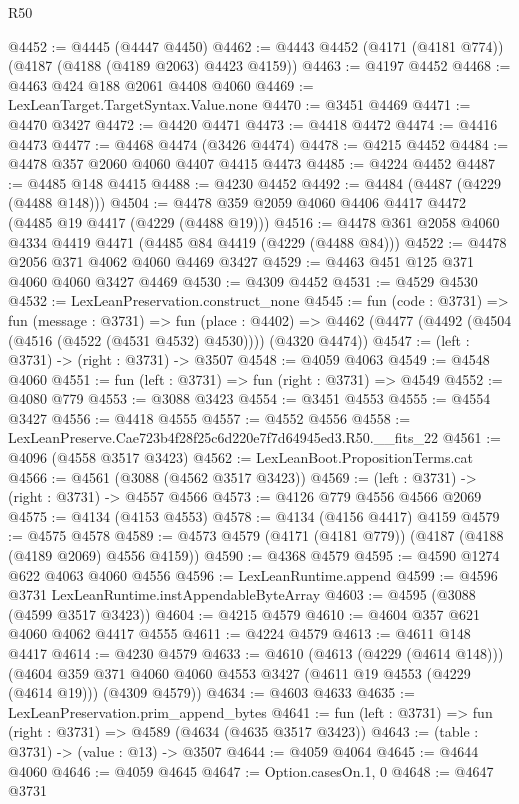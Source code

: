 \begin{lexlean}{R50}
\begin{coremodule}
@4452 := @4445 (@4447 @4450)
@4462 := @4443 @4452 (@4171 (@4181 @774)) (@4187 (@4188 (@4189 @2063) @4423 @4159))
@4463 := @4197 @4452
@4468 := @4463 @424 @188 @2061 @4408 @4060
@4469 := LexLeanTarget.TargetSyntax.Value.none
@4470 := @3451 @4469
@4471 := @4470 @3427
@4472 := @4420 @4471
@4473 := @4418 @4472
@4474 := @4416 @4473
@4477 := @4468 @4474 (@3426 @4474)
@4478 := @4215 @4452
@4484 := @4478 @357 @2060 @4060 @4407 @4415 @4473
@4485 := @4224 @4452
@4487 := @4485 @148 @4415
@4488 := @4230 @4452
@4492 := @4484 (@4487 (@4229 (@4488 @148)))
@4504 := @4478 @359 @2059 @4060 @4406 @4417 @4472 (@4485 @19 @4417 (@4229 (@4488 @19)))
@4516 := @4478 @361 @2058 @4060 @4334 @4419 @4471 (@4485 @84 @4419 (@4229 (@4488 @84)))
@4522 := @4478 @2056 @371 @4062 @4060 @4469 @3427
@4529 := @4463 @451 @125 @371 @4060 @4060 @3427 @4469
@4530 := @4309 @4452
@4531 := @4529 @4530
@4532 := LexLeanPreservation.construct_none
@4545 := fun (code : @3731) =>
  fun (message : @3731) =>
  fun (place : @4402) =>
  @4462 (@4477 (@4492 (@4504 (@4516 (@4522 (@4531 @4532) @4530)))) (@4320 @4474))
@4547 := (left : @3731) -> (right : @3731) -> @3507
@4548 := @4059 @4063
@4549 := @4548 @4060
@4551 := fun (left : @3731) => fun (right : @3731) => @4549
@4552 := @4080 @779
@4553 := @3088 @3423
@4554 := @3451 @4553
@4555 := @4554 @3427
@4556 := @4418 @4555
@4557 := @4552 @4556
@4558 := LexLeanPreserve.Cae723b4f28f25c6d220e7f7d64945ed3.R50.__fits_22
@4561 := @4096 (@4558 @3517 @3423)
@4562 := LexLeanBoot.PropositionTerms.cat
@4566 := @4561 (@3088 (@4562 @3517 @3423))
@4569 := (left : @3731) -> (right : @3731) -> @4557 @4566
@4573 := @4126 @779 @4556 @4566 @2069
@4575 := @4134 (@4153 @4553)
@4578 := @4134 (@4156 @4417) @4159
@4579 := @4575 @4578
@4589 := @4573 @4579 (@4171 (@4181 @779)) (@4187 (@4188 (@4189 @2069) @4556 @4159))
@4590 := @4368 @4579
@4595 := @4590 @1274 @622 @4063 @4060 @4556
@4596 := LexLeanRuntime.append
@4599 := @4596 @3731 LexLeanRuntime.instAppendableByteArray
@4603 := @4595 (@3088 (@4599 @3517 @3423))
@4604 := @4215 @4579
@4610 := @4604 @357 @621 @4060 @4062 @4417 @4555
@4611 := @4224 @4579
@4613 := @4611 @148 @4417
@4614 := @4230 @4579
@4633 := @4610
    (@4613 (@4229 (@4614 @148)))
    (@4604 @359 @371 @4060 @4060 @4553 @3427 (@4611 @19 @4553 (@4229 (@4614 @19))) (@4309 @4579))
@4634 := @4603 @4633
@4635 := LexLeanPreservation.prim_append_bytes
@4641 := fun (left : @3731) => fun (right : @3731) => @4589 (@4634 (@4635 @3517 @3423))
@4643 := (table : @3731) -> (value : @13) -> @3507
@4644 := @4059 @4064
@4645 := @4644 @4060
@4646 := @4059 @4645
@4647 := Option.casesOn.{1, 0}
@4648 := @4647 @3731

\end{coremodule}
\end{lexlean}

